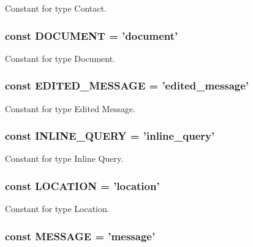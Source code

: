Constant for type Contact. \hypertarget{class_telegram_a6494d627239bf203e03297843bf52053}{
\subsubsection[{D\-O\-C\-U\-M\-E\-N\-T}]{\setlength{\rightskip}{0pt plus 5cm}const D\-O\-C\-U\-M\-E\-N\-T = 'document'}}\label{class_telegram_a6494d627239bf203e03297843bf52053}
Constant for type Document. \hypertarget{class_telegram_aa469cc007db1409d59a5e5bfac0633ec}{
\subsubsection[{E\-D\-I\-T\-E\-D\-\_\-\-M\-E\-S\-S\-A\-G\-E}]{\setlength{\rightskip}{0pt plus 5cm}const E\-D\-I\-T\-E\-D\-\_\-\-M\-E\-S\-S\-A\-G\-E = 'edited\-\_\-message'}}\label{class_telegram_aa469cc007db1409d59a5e5bfac0633ec}
Constant for type Edited Message. \hypertarget{class_telegram_aea04c33722ec566f4d25049ed3e749f8}{
\subsubsection[{I\-N\-L\-I\-N\-E\-\_\-\-Q\-U\-E\-R\-Y}]{\setlength{\rightskip}{0pt plus 5cm}const I\-N\-L\-I\-N\-E\-\_\-\-Q\-U\-E\-R\-Y = 'inline\-\_\-query'}}\label{class_telegram_aea04c33722ec566f4d25049ed3e749f8}
Constant for type Inline Query. \hypertarget{class_telegram_aca699735a6cec340e45cde5c623bdb32}{
\subsubsection[{L\-O\-C\-A\-T\-I\-O\-N}]{\setlength{\rightskip}{0pt plus 5cm}const L\-O\-C\-A\-T\-I\-O\-N = 'location'}}\label{class_telegram_aca699735a6cec340e45cde5c623bdb32}
Constant for type Location. \hypertarget{class_telegram_af9b451d04eb24044a2d4112be10de570}{
\subsubsection[{M\-E\-S\-S\-A\-G\-E}]{\setlength{\rightskip}{0pt plus 5cm}const M\-E\-S\-S\-A\-G\-E = 'message'}}\label{class_telegram_af9b451d04eb24044a2d4112be10de570}
